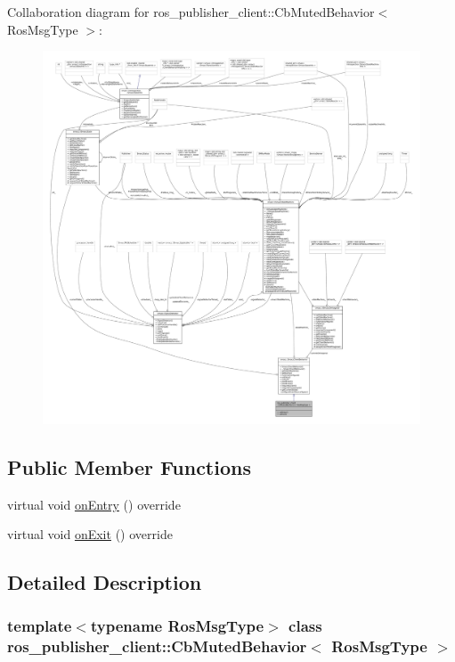 Collaboration diagram for ros\+\_\+publisher\+\_\+client\+:\+:Cb\+Muted\+Behavior$<$ Ros\+Msg\+Type $>$\+:
\nopagebreak
\begin{figure}[H]
\begin{center}
\leavevmode
\includegraphics[width=350pt]{classros__publisher__client_1_1CbMutedBehavior__coll__graph}
\end{center}
\end{figure}
\subsection*{Public Member Functions}
\begin{DoxyCompactItemize}
\item 
virtual void \hyperlink{classros__publisher__client_1_1CbMutedBehavior_a080b2db7ff4aa25463423e4b0a8ee572}{on\+Entry} () override
\item 
virtual void \hyperlink{classros__publisher__client_1_1CbMutedBehavior_aad2c833afdc6f5d81f3ddce3c0f767e3}{on\+Exit} () override
\end{DoxyCompactItemize}


\subsection{Detailed Description}
\subsubsection*{template$<$typename Ros\+Msg\+Type$>$\newline
class ros\+\_\+publisher\+\_\+client\+::\+Cb\+Muted\+Behavior$<$ Ros\+Msg\+Type $>$}



